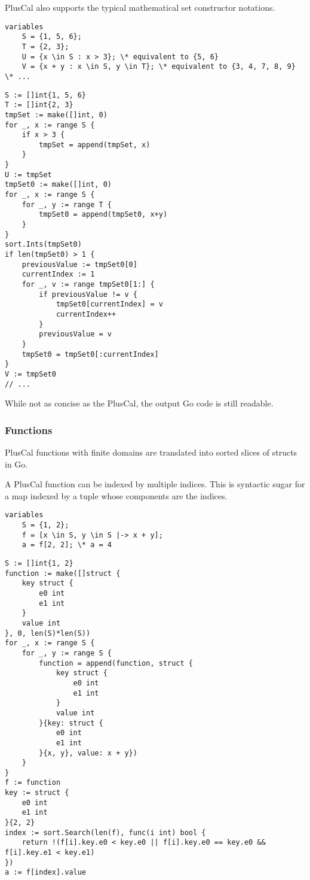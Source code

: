 PlusCal also supports the typical mathematical set constructor notations.

\noindent
\begin{minipage}[t]{\textwidth}
\begin{lstlisting}[language=pcal]
variables
	S = {1, 5, 6};
	T = {2, 3};
	U = {x \in S : x > 3}; \* equivalent to {5, 6}
	V = {x + y : x \in S, y \in T}; \* equivalent to {3, 4, 7, 8, 9}
\* ...
\end{lstlisting}
\end{minipage}

\noindent
\begin{minipage}[t]{\textwidth}
\begin{lstlisting}[language=golang]
S := []int{1, 5, 6}
T := []int{2, 3}
tmpSet := make([]int, 0)
for _, x := range S {
	if x > 3 {
		tmpSet = append(tmpSet, x)
	}
}
U := tmpSet
tmpSet0 := make([]int, 0)
for _, x := range S {
	for _, y := range T {
		tmpSet0 = append(tmpSet0, x+y)
	}
}
sort.Ints(tmpSet0)
if len(tmpSet0) > 1 {
	previousValue := tmpSet0[0]
	currentIndex := 1
	for _, v := range tmpSet0[1:] {
		if previousValue != v {
			tmpSet0[currentIndex] = v
			currentIndex++
		}
		previousValue = v
	}
	tmpSet0 = tmpSet0[:currentIndex]
}
V := tmpSet0
// ...
\end{lstlisting}
\end{minipage}

While not as concise as the PlusCal, the output Go code is still readable.

\subsubsection{Functions}
PlusCal functions with finite domains are translated into sorted slices of structs in Go.

A PlusCal function can be indexed by multiple indices. This is syntactic sugar for a map indexed by a tuple whose components are the indices.

\noindent
\begin{minipage}[t]{\textwidth}
\begin{lstlisting}[language=pcal]
variables
	S = {1, 2};
	f = [x \in S, y \in S |-> x + y];
	a = f[2, 2]; \* a = 4
\end{lstlisting}
\end{minipage}

\noindent
\begin{minipage}[t]{\textwidth}
\begin{lstlisting}[language=golang]
S := []int{1, 2}
function := make([]struct {
	key struct {
		e0 int
		e1 int
	}
	value int
}, 0, len(S)*len(S))
for _, x := range S {
	for _, y := range S {
		function = append(function, struct {
			key struct {
				e0 int
				e1 int
			}
			value int
		}{key: struct {
			e0 int
			e1 int
		}{x, y}, value: x + y})
	}
}
f := function
key := struct {
	e0 int
	e1 int
}{2, 2}
index := sort.Search(len(f), func(i int) bool {
	return !(f[i].key.e0 < key.e0 || f[i].key.e0 == key.e0 && f[i].key.e1 < key.e1)
})
a := f[index].value
\end{lstlisting}
\end{minipage}

